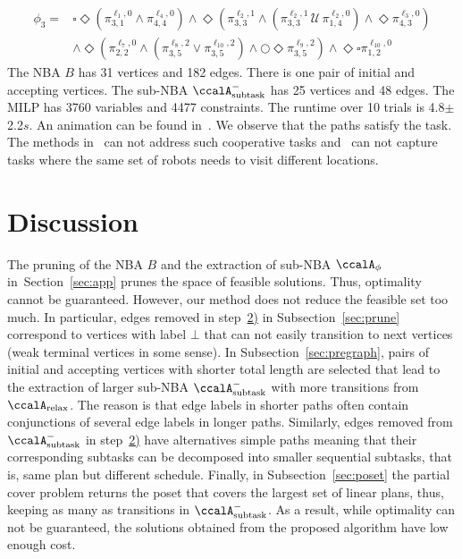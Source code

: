 \documentclass[Afour,sageh,times]{sagej}
\newcommand{\auto}[1]{\ccalA_{\textup{#1}}}
\newcommand{\autop}{\ccalA_{\phi}}
\newcommand{\aap}[4]{\mathcal{\pi}_{{#1},{#2}}^{#3,#4}}
\begin{document}
{{{\small
\begingroup
\begin{align*}
  \phi_3 = &  \square \Diamond (\pi^{\ell_1,0}_{3,1} \wedge \pi^{\ell_4, 0}_{4,4}) \wedge \Diamond ( \pi^{\ell_2,1}_{3,3} \wedge  (\pi^{\ell_2,1}_{3,3} \,\mathcal{U} \, \pi^{\ell_2,0}_{1,4})  \wedge \Diamond \pi_{4,3}^{\ell_3,0})   \nonumber \\ & \wedge \Diamond (\aap{2}{2}{\ell_7}{0} \wedge (\aap{3}{5}{\ell_8}{2} \vee \aap{3}{5}{\ell_{10}}{2}) \wedge \bigcirc  \Diamond  \aap{3}{5}{\ell_{9}}{2} ) \wedge \Diamond \square \aap{1}{2}{\ell_{10}}{0}
\end{align*}
\endgroup
\normalsize
The NBA $B$ has 31 vertices and 182 edges. There is one pair of initial and accepting vertices. The sub-NBA $\auto{subtask}^-$ has 25 vertices and 48 edges. The MILP has 3760 variables and 4477 constraints. The runtime over 10 trials is 4.8$\pm$2.2$s$. {An animation can be found in~\cite{ltlmrta}.} We observe that the paths satisfy the task. The methods in~\cite{schillinger2018decomposition,schillinger2018simultaneous,faruq2018simultaneous} can not address such cooperative tasks and~\cite{sahin2017provably,sahin2017synchronous,sahin2019multi,sahin2019multirobot} can not capture tasks where the same set of robots needs to visit different locations.


\section{Discussion}
The pruning of the NBA $B$ and the extraction of sub-NBA $\autop$ in~Section~\ref{sec:app} prunes the space of feasible solutions. Thus, optimality cannot be guaranteed. However, our method does not reduce the feasible set  too much. In particular, edges removed in step~\hyperref[prune:2]{2)} in Subsection~\ref{sec:prune} correspond to vertices with label $\bot$ that can not easily transition to next vertices {(weak terminal vertices in some sense)}. {In Subsection~\ref{sec:pregraph}, pairs of initial and accepting vertices with shorter total length are selected that lead to the  extraction of larger sub-NBA $\auto{subtask}^-$ {with more transitions} from $\auto{relax}$.} {The reason is that edge labels in shorter paths often contain conjunctions of several edge labels in longer paths}. Similarly, edges removed from $\auto{subtask}^-$ in step~\hyperref[sec:pregraph]{2)} {have alternatives simple paths} meaning that their corresponding subtasks can be decomposed into smaller sequential subtasks, {that is, same plan but different schedule}. Finally, in Subsection~\ref{sec:poset} the partial cover problem returns the poset that covers the largest set of linear plans, thus, keeping as many as transitions in $\auto{subtask}^-$. As a result, while optimality can not be guaranteed,  the solutions obtained from the proposed algorithm have low  enough cost. %
}}}
\end{document}
